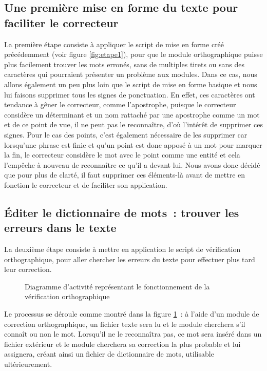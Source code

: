 \subsection{Une première mise en forme du texte pour faciliter le correcteur}
La première étape consiste à appliquer le script de mise en forme créé précédemment (voir figure \ref{fig:etape1}), pour que le module orthographique puisse plus facilement trouver les mots erronés, sans de multiples tirets ou sans des caractères qui pourraient présenter un problème aux modules. Dans ce cas, nous allons également un peu plus loin que le script de mise en forme basique et nous lui faisons supprimer tous les signes de ponctuation. En effet, ces caractères ont tendance à gêner le correcteur, comme l'apostrophe, puisque le correcteur considère un déterminant et un nom rattaché par une apostrophe comme un mot et de ce point de vue, il ne peut pas le reconnaître, d'où l'intérêt de supprimer ces signes. Pour le cas des points, c'est également nécessaire de les supprimer car lorsqu'une phrase est finie et qu'un point est donc apposé à un mot pour marquer la fin, le correcteur considère le mot avec le point comme une entité et cela l'empêche à nouveau de reconnaître ce qu'il a devant lui. Nous avons donc décidé que pour plus de clarté, il faut supprimer ces éléments-là avant de mettre en fonction le correcteur et de faciliter son application.

\subsection{Éditer le dictionnaire de mots~: trouver les erreurs dans le texte}
La deuxième étape consiste à mettre en application le script de vérification orthographique, pour aller chercher les erreurs du texte pour effectuer plus tard leur correction.
\begin{figure}[t]
    \centering
    \caption{Diagramme d'activité représentant le fonctionnement de la vérification orthographique}
    \label{fig:etape2}
\end{figure}
Le processus se déroule comme montré dans la figure \ref{fig:etape2}~: à l'aide d'un module de correction orthographique, un fichier texte sera lu et le module cherchera s'il connaît ou non le mot. Lorsqu'il ne le reconnaîtra pas, ce mot sera inséré dans un fichier extérieur et le module cherchera sa correction la plus probable et lui assignera, créant ainsi un fichier de dictionnaire de mots, utilisable ultérieurement.

